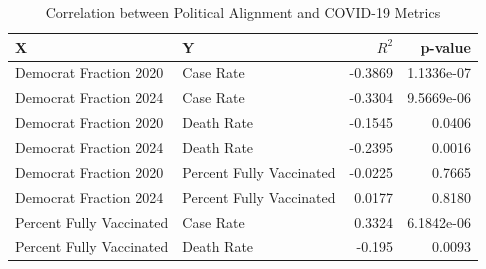 \documentclass[10pt,journal,compsoc]{IEEEtran}
\begin{document}
\begin{table}[h]
    \centering
    \begin{tabular}{|l|l|r|r|}
        \hline
        \textbf{X} & \textbf{Y} & $R^2$ & \textbf{p-value} \\
        \hline
        Democrat Fraction 2020 & Case Rate & -0.3869 & 1.1336e-07 \\
        Democrat Fraction 2024 & Case Rate & -0.3304 & 9.5669e-06 \\
        Democrat Fraction 2020 & Death Rate & -0.1545 & 0.0406 \\
        Democrat Fraction 2024 & Death Rate & -0.2395 & 0.0016 \\
        Democrat Fraction 2020 & Percent Fully Vaccinated & -0.0225 & 0.7665 \\
        Democrat Fraction 2024 & Percent Fully Vaccinated & 0.0177 & 0.8180 \\
        Percent Fully Vaccinated & Case Rate & 0.3324 & 6.1842e-06 \\
        Percent Fully Vaccinated & Death Rate & -0.195 & 0.0093 \\
        \hline
    \end{tabular}
    \caption{Correlation between Political Alignment and COVID-19 Metrics}
    \label{tab:correlations}
\end{table}
\end{document}
